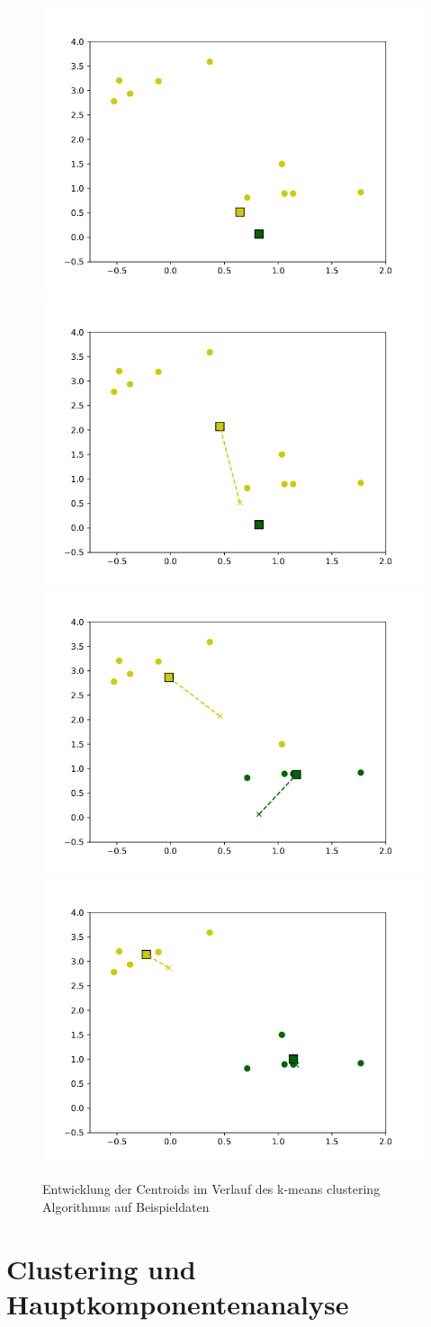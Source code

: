 \documentclass[]{book}
\theoremstyle{definition}
\theoremstyle{definition}
\theoremstyle{definition}
\theoremstyle{definition}
\theoremstyle{remark}
\begin{document}
\begin{figure}

{\centering \includegraphics[width=0.4\linewidth]{bilder/06-plot1} \includegraphics[width=0.4\linewidth]{bilder/06-plot2} \includegraphics[width=0.4\linewidth]{bilder/06-plot4} \includegraphics[width=0.4\linewidth]{bilder/06-plot6} 

}

\caption{Entwicklung der Centroids im Verlauf des k-means clustering Algorithmus auf Beispieldaten}\label{fig:k-means-evoexa}
\end{figure}

\hypertarget{clustering-und-hauptkomponentenanalyse-1}{%
\section{Clustering und Hauptkomponentenanalyse}\label{clustering-und-hauptkomponentenanalyse-1}}
\end{document}
